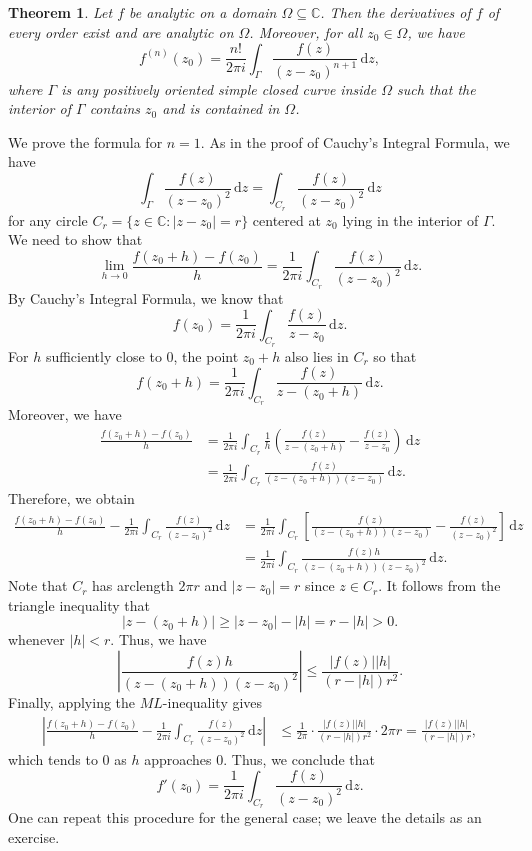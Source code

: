 \documentclass[10pt]{article}
\makeatletter
\newcommand{\C}{\mathbb{C}}
\newcommand{\dd}{\,\mathrm{d}}
\theoremstyle{newstyle}
\newtheorem{thm}{Theorem}[section]
\newenvironment{pf}[1][\proofname]{\par
  \pushQED{\qed}%
  \normalfont \topsep0\p@\relax
  \trivlist
  \item[\hskip\labelsep\scshape
  #1\@addpunct{.}]\ignorespaces
}{%
  \popQED\endtrivlist\@endpefalse
}
\makeatother
\begin{document}
\begin{thm}
Let $f$ be analytic on a domain $\Omega \subseteq \C$. Then the derivatives 
of $f$ of every order exist and are analytic on $\Omega$. Moreover, 
for all $z_0 \in \Omega$, we have 
\[ f^{(n)}(z_0) = \frac{n!}{2\pi i} \int_\Gamma \frac{f(z)}{(z-z_0)^{n+1}}\dd z, \]
where $\Gamma$ is any positively oriented simple closed curve inside $\Omega$
such that the interior of $\Gamma$ contains $z_0$ and is contained in $\Omega$.
\end{thm}
\begin{pf}
We prove the formula for $n = 1$. As in the proof of Cauchy's Integral Formula, we have 
\[ \int_\Gamma \frac{f(z)}{(z-z_0)^2}\dd z = \int_{C_r} \frac{f(z)}{(z-z_0)^2} \dd z \]
for any circle $C_r = \{z \in \C : |z - z_0| = r\}$ centered at $z_0$ lying in the interior 
of $\Gamma$. We need to show that 
\[ \lim_{h\to0} \frac{f(z_0+h) - f(z_0)}{h} = \frac{1}{2\pi i} \int_{C_r} \frac{f(z)}{(z-z_0)^2}\dd z. \]
By Cauchy's Integral Formula, we know that 
\[ f(z_0) = \frac{1}{2\pi i} \int_{C_r} \frac{f(z)}{z-z_0}\dd z. \]
For $h$ sufficiently close to $0$, the point $z_0 + h$ also lies in $C_r$ so that 
\[ f(z_0 + h) = \frac{1}{2\pi i} \int_{C_r} \frac{f(z)}{z - (z_0 + h)} \dd z. \]
Moreover, we have 
\begin{align*}
    \frac{f(z_0 + h) - f(z_0)}h 
    &= \frac{1}{2\pi i} \int_{C_r} \frac1h \left( \frac{f(z)}{z - (z_0 + h)} - \frac{f(z)}{z-z_0} 
    \right) \dd z \\
    &= \frac{1}{2\pi i} \int_{C_r} \frac{f(z)}{(z-(z_0+h))(z-z_0)} \dd z. 
\end{align*}
Therefore, we obtain 
\begin{align*}
    \frac{f(z_0 + h) - f(z_0)}h - \frac{1}{2\pi i} \int_{C_r} \frac{f(z)}{(z-z_0)^2}\dd z 
    &= \frac{1}{2\pi i} \int_{C_r} \left[ \frac{f(z)}{(z-(z_0+h))(z-z_0)} - 
    \frac{f(z)}{(z-z_0)^2} \right] \dd z \\
    &= \frac{1}{2\pi i} \int_{C_r} \frac{f(z)h}{(z-(z_0+h))(z-z_0)^2}\dd z.
\end{align*}
Note that $C_r$ has arclength $2\pi r$ and $|z - z_0| = r$ since $z \in C_r$. 
It follows from the triangle inequality that 
\[ |z - (z_0 + h)| \geq |z - z_0| - |h| = r - |h| > 0. \]
whenever $|h| < r$. Thus, we have 
\[ \left| \frac{f(z)h}{(z-(z_0+h))(z-z_0)^2} \right| \leq \frac{|f(z)||h|}{(r-|h|)r^2}. \]
Finally, applying the $ML$-inequality gives 
\begin{align*}
    \left| \frac{f(z_0 + h) - f(z_0)}h - \frac{1}{2\pi i} \int_{C_r} \frac{f(z)}{(z-z_0)^2}\dd z 
    \right| 
    &\leq \frac{1}{2\pi} \cdot \frac{|f(z)||h|}{(r-|h|)r^2} \cdot 2\pi r 
    = \frac{|f(z)||h|}{(r-|h|)r},
\end{align*}
which tends to $0$ as $h$ approaches $0$. Thus, we conclude that 
\[ f'(z_0) = \frac{1}{2\pi i} \int_{C_r} \frac{f(z)}{(z-z_0)^2}\dd z. \]
One can repeat this procedure for the general case; we leave the details as an exercise. 
\end{pf}
\end{document}
